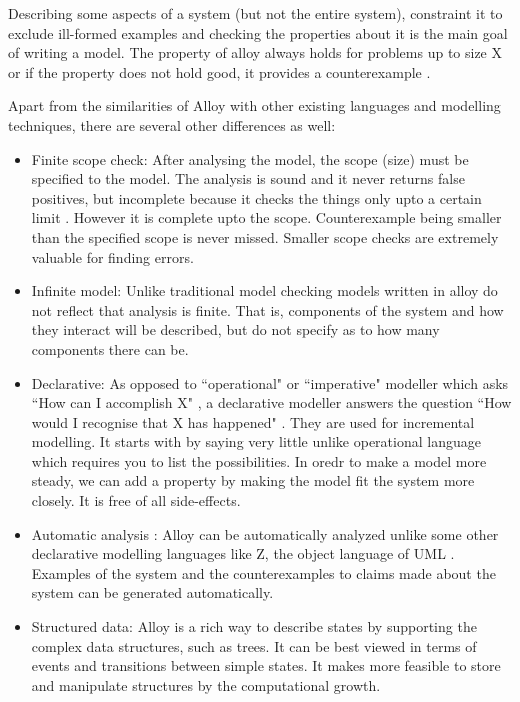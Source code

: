 \documentclass[a4paper,12pt]{report}
\begin{document}
Describing some aspects of a system (but not the entire system), constraint it to exclude ill-formed examples and checking the properties about it is the main goal of writing a model. The property of alloy always holds for problems up to size X or if the property does not hold good, it provides a counterexample \cite{Yeung2005}.

Apart from the similarities of Alloy with other existing languages and modelling techniques, there are several other differences as well:
\begin{itemize}
\item Finite scope check: After analysing the model, the scope (size) must be specified to the model. The analysis is sound and it never returns false positives, but incomplete because it checks the things only upto a certain limit \cite{DanielJackson2004}. However it is complete upto the scope. Counterexample being smaller than the specified scope is never missed. Smaller scope checks are extremely valuable for finding errors. 
\item Infinite model: Unlike traditional model checking models written in alloy do not reflect that analysis is finite\cite{J.M.Wing1996}. That is, components of the system and how they interact will be described, but do not specify as to how many components there can be. 
\item Declarative: As opposed to ``operational" or ``imperative" modeller which asks ``How can I accomplish X" , a declarative modeller answers the question ``How would I recognise that X has happened" \cite{DanielJackson2004}. They are used for incremental modelling. It starts with by saying very little unlike operational language which requires you to list the possibilities. In oredr to make a model more steady, we can add a property by making the model fit the system more closely. It is free of all side-effects.
\item Automatic analysis : Alloy can be automatically analyzed unlike some other declarative modelling languages like Z, the object language of UML \cite{J.M.Spivey1989}. 
Examples of the system and the counterexamples to claims made about the system can be generated automatically.
\item Structured data: Alloy is a rich way to describe states by supporting the complex data structures, such as trees. It can be best viewed in terms of events and transitions between simple states. It makes more feasible to store and manipulate structures by the computational growth. 
\end{itemize}
\end{document}
